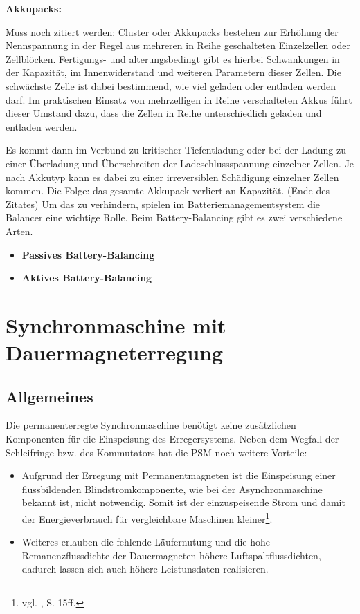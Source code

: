\textbf{Akkupacks:}

Muss noch zitiert werden: Cluster oder Akkupacks bestehen zur Erhöhung der Nennspannung in der Regel aus mehreren in Reihe geschalteten Einzelzellen oder Zellblöcken. Fertigungs- und alterungsbedingt gibt es hierbei Schwankungen in der Kapazität, im Innenwiderstand und weiteren Parametern dieser Zellen. Die schwächste Zelle ist dabei bestimmend, wie viel geladen oder entladen werden darf. Im praktischen Einsatz von mehrzelligen in Reihe verschalteten Akkus führt dieser Umstand dazu, dass die Zellen in Reihe unterschiedlich geladen und entladen werden.

Es kommt dann im Verbund zu kritischer Tiefentladung oder bei der Ladung zu einer Überladung und Überschreiten der Ladeschlussspannung einzelner Zellen. Je nach Akkutyp kann es dabei zu einer irreversiblen Schädigung einzelner Zellen kommen. Die Folge: das gesamte Akkupack verliert an Kapazität. (Ende des Zitates)
Um das zu verhindern, spielen im Batteriemanagementsystem die Balancer eine wichtige Rolle. Beim Battery-Balancing gibt es zwei verschiedene Arten. 
\begin{itemize}
\item \textbf{Passives Battery-Balancing} \medskip\\
\item \textbf{Aktives Battery-Balancing} \medskip\\
\end{itemize}

\newpage

\section{Synchronmaschine mit Dauermagneterregung}
\subsection{Allgemeines}
Die permanenterregte Synchronmaschine benötigt keine zusätzlichen Komponenten für die Einspeisung des Erregersystems. Neben dem Wegfall der Schleifringe bzw. des Kommutators hat die PSM noch weitere Vorteile:
\\[5mm]
\begin{itemize}
	\item Aufgrund der Erregung mit Permanentmagneten ist die Einspeisung einer flussbildenden Blindstromkomponente, wie bei der Asynchronmaschine bekannt ist, nicht notwendig. Somit ist der einzuspeisende Strom und damit der Energieverbrauch für vergleichbare Maschinen kleiner\footnote{vgl. \cite{Dissertation}, S. 15ff.}. \medskip
	\item Weiteres erlauben die fehlende Läufernutung und die hohe Remanenzflussdichte der Dauermagneten höhere Luftspaltflussdichten, dadurch lassen sich auch höhere Leistunsdaten realisieren. \\[4mm]
\end{itemize}


